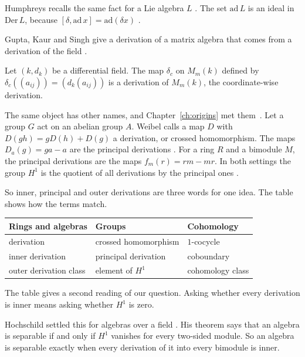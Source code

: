 Humphreys recalls the same fact for a Lie algebra $L$
\cite[\S5.3, p.~23]{Humphreys1972}. The set $\mathrm{ad}\,L$ is an ideal in
$\mathrm{Der}\,L$, because $[\delta,\mathrm{ad}\,x]=\mathrm{ad}(\delta x)$
\cite[\S5.3, p.~23]{Humphreys1972}.

Gupta, Kaur and Singh give a derivation of a matrix algebra that comes from a
derivation of the field \cite[Example~1.4]{GuptaKaurSingh2023}.

\begin{example}\label{ex:basic:matrices}
Let $(k,d_k)$ be a differential field. The map $\delta_c$ on $M_m(k)$ defined by
$\delta_c((a_{ij}))=(d_k(a_{ij}))$ is a derivation of $M_m(k)$, the
coordinate-wise derivation.
\end{example}

The same object has other names, and Chapter~\ref{ch:origins} met them~\cite[Lemma~9.2.1,
p.~306]{Weibel1994}. Let a
group $G$ act on an abelian group $A$. Weibel calls a map $D$ with $D(gh) =
gD(h) + D(g)$ a derivation, or crossed homomorphism. The maps $D_a(g) = ga -
a$ are the principal derivations \cite[Definition~6.4.1,
Example~6.4.2, p.~174]{Weibel1994}. For a ring $R$ and a bimodule $M$, the principal
derivations are the maps $f_m(r) = rm - mr$. In both settings the group $H^1$
is the quotient of all derivations by the principal ones \cite[Lemma~9.2.1,
p.~306]{Weibel1994}.

So inner, principal and outer derivations are three words for one idea. The
table shows how the terms match.

\begin{center}
\begin{tabular}{lll}
Rings and algebras & Groups & Cohomology \\ \hline
derivation & crossed homomorphism & $1$-cocycle \\
inner derivation & principal derivation & coboundary \\
outer derivation class & element of $H^1$ & cohomology class \\
\end{tabular}
\end{center}

The table gives a second reading of our question. Asking whether every
derivation is inner means asking whether $H^1$ is zero.

Hochschild settled this for algebras over a field
\cite[Theorem~4.1]{Hochschild1945}. His theorem says that an algebra is
separable if and only if $H^1$ vanishes for every two-sided module. So an
algebra is separable exactly when every derivation of it into every bimodule
is inner.

